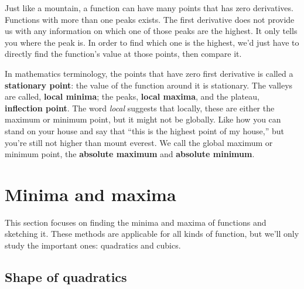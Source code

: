 Just like a mountain, a function can have many points that has zero derivatives. Functions with more than one peaks exists. The first derivative does not provide us with any information on which one of those peaks are the highest. It only tells you where the peak is. In order to find which one is the highest, we'd just have to directly find the function's value at those points, then compare it.

In mathematics terminology, the points that have zero first derivative is called a \textbf{stationary point}: the value of the function around it is stationary. The valleys are called, \textbf{local minima}; the peaks, \textbf{local maxima}, and the plateau, \textbf{inflection point}. The word \emph{local} suggests that locally, these are either the maximum or minimum point, but it might not be globally. Like how you can stand on your house and say that \enquote{this is the highest point of my house,} but you're still not higher than mount everest. We call the global maximum or minimum point, the \textbf{absolute maximum} and \textbf{absolute minimum}. 

\section{Minima and maxima}
\label{sec:minima-and-maxima}

This section focuses on finding the minima and maxima of functions and sketching it. These methods are applicable for all kinds of function, but we'll only study the important ones: quadratics and cubics.

\subsection{Shape of quadratics}

